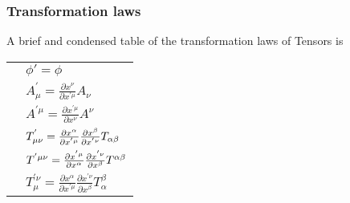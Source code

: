 \subsubsection{Transformation laws}
A brief and condensed table of the transformation laws of Tensors is
\begin{table}[H]
\centering
\begin{NiceTabular}{ll}
\toprule
{} & \\ \midrule
{} & $\phi'=\phi$\\
 & $A^{'}_\mu=\frac{\partial x^\nu}{\partial x^{'\mu}}A_\nu$\\
 & $A^{'\mu}=\frac{\partial x^{'\mu}}{\partial x^\nu}A^\nu$\\
 & $T^{'}_{\mu\nu}=\frac{\partial x^\alpha}{\partial x^{'\mu}}\frac{\partial x^\beta}{\partial x^{'\nu}}T_{\alpha\beta}$\\
 & $T^{'{\mu\nu}}=\frac{\partial x^{'\mu}}{\partial x^\alpha}\frac{\partial x^{'\nu}}{\partial x^\beta}T^{\alpha\beta}$\\
 & $T^{'\nu}_\mu=\frac{\partial x^\alpha}{\partial x^{'\mu}}\frac{\partial x^{'\nu}}{\partial x^\beta}T^\beta_\alpha$\\ \bottomrule
\end{NiceTabular}
\end{table}
